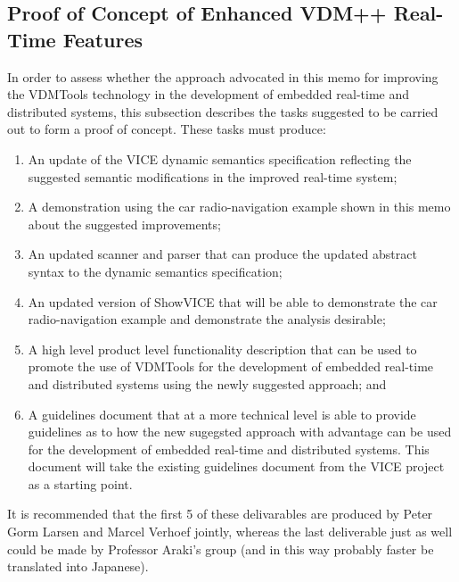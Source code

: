\subsection{Proof of Concept of Enhanced VDM++ Real-Time Features}

In order to assess whether the approach advocated in this memo for 
improving the VDMTools technology in the development of embedded real-time 
and distributed systems, this subsection describes the tasks suggested to 
be carried out to form a proof of concept. These tasks must produce:

\begin{enumerate}
\item An update of the VICE dynamic semantics specification reflecting 
      the suggested 
      semantic modifications in the improved real-time system;
\item A demonstration using the car radio-navigation example shown 
      in this memo about the suggested improvements;
\item An updated scanner and parser that can produce the updated 
      abstract syntax to the dynamic semantics specification;
\item An updated version of ShowVICE that will be able to demonstrate 
      the car radio-navigation example and demonstrate the analysis desirable; 
\item A high level product level functionality description that can be used
      to promote the use of VDMTools for the development of embedded
      real-time and distributed systems using the newly suggested approach; and
\item A guidelines document that at a more technical level is able to 
      provide guidelines as to how the new sugegsted approach with advantage
      can be used for the development of embedded real-time and distributed 
      systems. This document will take the existing guidelines document from 
      the VICE project as a starting point.
\end{enumerate}

It is recommended that the first 5 of these delivarables are produced by 
Peter Gorm Larsen and Marcel Verhoef jointly, whereas the last deliverable 
just as well could be made by Professor Araki's group (and in this way 
probably faster be translated into Japanese).